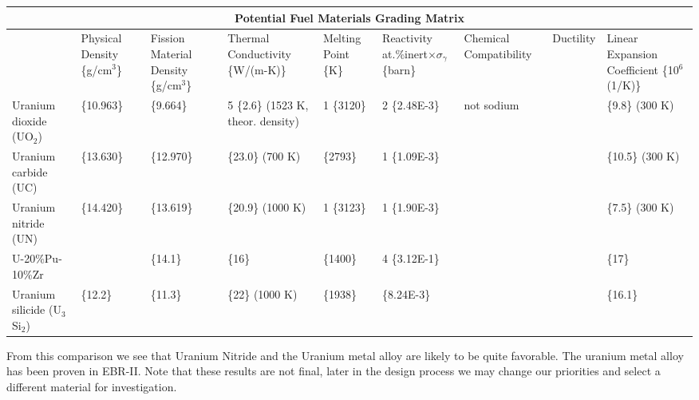 \documentclass[]{report}
\begin{document}
\begin{center}
\hspace*{-2cm} %
\begin{tabular}[c]{| p{1.6cm} | p{1.2cm} | p{2.05cm} | p{1.5cm} | p{1.5cm} | p{2.0cm} | p{1.5cm} | p{1.5cm} | p{2cm} |}
\hline
\multicolumn{9}{|c|}{Potential Fuel Materials Grading Matrix} \\
\hline
 & Physical Density \{g/cm$^3$\} & Fission Material Density \{g/cm$^3$\} & Thermal Conductivity  \{W/(m-K)\} & Melting Point \{K\} & Reactivity at.\%inert$\times \sigma_{\gamma}$ \{barn\} & Chemical Compatibility & Ductility & Linear Expansion Coefficient \{10$^6$(1/K)\} \\
\hline
Uranium dioxide (UO$_2$) & \{10.963\} & \{9.664\} & 5 \{2.6\} (1523 K, theor. density) & 1 \{3120\} & 2 \{2.48E-3\} & not sodium & & \{9.8\} (300 K)  \\
\hline
Uranium carbide (UC) & \{13.630\} & \{12.970\} & \{23.0\} (700 K) & \{2793\} & 1 \{1.09E-3\} & & & \{10.5\} (300 K)\\
\hline
Uranium nitride (UN) & \{14.420\} & \{13.619\} & \{20.9\} (1000 K) & 1 \{3123\} & 1 \{1.90E-3\} & & & \{7.5\} (300 K) \\
\hline
U-20\%Pu-10\%Zr & & \{14.1\} & \{16\} & \{1400\} & 4 \{3.12E-1\} &  & & \{17\}\\
\hline
Uranium silicide (U$_3$Si$_2$)  & \{12.2\} & \{11.3\} & \{22\} (1000 K) & \{1938\} & \{8.24E-3\} & & & \{16.1\}\\
\hline

\end{tabular}
\end{center}

From this comparison we see that Uranium Nitride and the Uranium metal alloy are likely to be quite favorable. The uranium metal alloy has been proven in EBR-II. Note that these results are not final, later in the design process we may change our priorities and select a different material for investigation.
\end{document}
